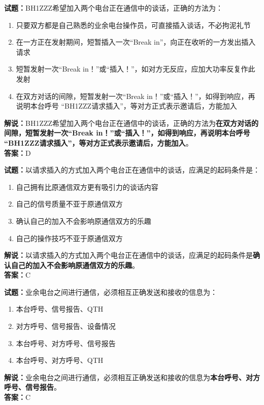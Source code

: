 \documentclass{ctexbook}
\begin{document}
\noindent\textbf{试题：}BH1ZZZ希望加入两个电台正在通信中的谈话，正确的方法为：
\begin{enumerate}[leftmargin=3em]
\item 只要双方都是自己熟悉的业余电台操作员，可直接插入谈话，不必拘泥礼节
\item 在一方正在发射期间，短暂插入一次“Break in”，向正在收听的一方发出插入请求
\item 短暂发射一次“Break in！”或“插入！”，如对方无反应，应加大功率反复作此发射
\item 在双方对话的间隙，短暂发射一次“Break in！”或“插入！”，如得到响应，再说明本台呼号 “BH1ZZZ请求插入”，等对方正式表示邀请后，方能加入
\end{enumerate}
\noindent\textbf{解说：}BH1ZZZ希望加入两个电台正在通信中的谈话，正确的方法为\textbf{在双方对话的间隙，短暂发射一次“Break in！”或“插入！”，如得到响应，再说明本台呼号 “BH1ZZZ请求插入”，等对方正式表示邀请后，方能加入}。\\\noindent\textbf{答案：}D

\bigskip




\noindent\textbf{试题：}以请求插入的方式加入两个电台正在通信中的谈话，应满足的起码条件是：
\begin{enumerate}[leftmargin=3em]
\item 自己拥有比原通信双方更有吸引力的谈话内容
\item 自己的信号质量不亚于原通信双方
\item 确认自己的加入不会影响原通信双方的乐趣
\item 自己的操作技巧不亚于原通信双方
\end{enumerate}
\noindent\textbf{解说：}以请求插入的方式加入两个电台正在通信中的谈话，应满足的起码条件是\textbf{确认自己的加入不会影响原通信双方的乐趣}。\\\noindent\textbf{答案：}C

\bigskip




\noindent\textbf{试题：}业余电台之间进行通信，必须相互正确发送和接收的信息为：
\begin{enumerate}[leftmargin=3em]
\item 本台呼号、信号报告、QTH
\item 对方呼号、信号报告、设备情况
\item 本台呼号、对方呼号、信号报告
\item 本台呼号、对方呼号、QTH
\end{enumerate}
\noindent\textbf{解说：}业余电台之间进行通信，必须相互正确发送和接收的信息为\textbf{本台呼号、对方呼号、信号报告}。\\\noindent\textbf{答案：}C
\end{document}
